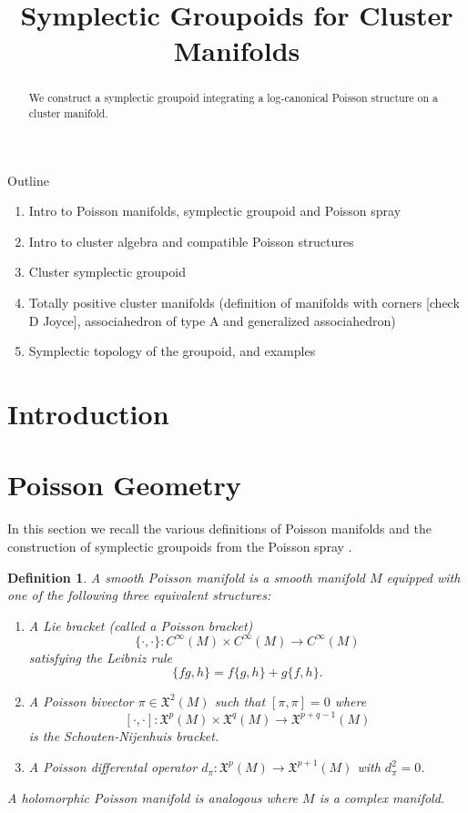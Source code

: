 \documentclass{amsart}
\title{Symplectic Groupoids for Cluster Manifolds}
\newtheorem{definition}[theorem]{Definition}
\begin{document}
\begin{abstract}
  We construct a symplectic groupoid integrating a log-canonical Poisson structure on a cluster manifold.
\end{abstract}
\maketitle
Outline
\begin{enumerate}
	\item Intro to Poisson manifolds, symplectic groupoid and Poisson spray
	\item Intro to cluster algebra and compatible Poisson structures 
	\item Cluster symplectic groupoid
	\item Totally positive cluster manifolds (definition of manifolds with corners [check D Joyce], associahedron of type A and generalized associahedron)
	\item Symplectic topology of the groupoid, and examples
\end{enumerate}

\section{Introduction}


\section{Poisson Geometry}
In this section we recall the various definitions of Poisson manifolds and the construction of symplectic groupoids from the Poisson spray \cite{MR2900786}.

\begin{definition}
A smooth Poisson manifold is a smooth manifold $M$ equipped with one of the following three equivalent structures:
  \begin{enumerate}
    \item A Lie bracket (called a Poisson bracket)
      $$
				\{\cdot, \cdot\}: C^\infty(M) \times C^\infty(M) \to C^\infty(M)
			$$
				satisfying the Leibniz rule
			$$
				\{fg, h\} = f\{g,h\} + g\{f,h\}.
			$$
		\item A Poisson bivector $\pi \in \mathfrak{X}^2(M)$ such that $[\pi, \pi] = 0$ where
			$$
				[\cdot, \cdot]: \mathfrak{X}^p(M) \times \mathfrak{X}^q(M) \to \mathfrak{X}^{p+q-1}(M)
			$$
			is the Schouten-Nijenhuis bracket.
		\item A Poisson differental operator $d_\pi: \mathfrak{X}^p(M) \to \mathfrak{X}^{p+1}(M)$ with $d_\pi^2 = 0$.
\end{enumerate}	
	A holomorphic Poisson manifold is analogous where $M$ is a complex manifold.
\end{definition}
\end{document}
